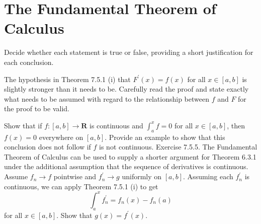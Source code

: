 \section{The Fundamental Theorem of Calculus}

\begin{exercise}
\end{exercise}
\begin{solution}
    \TODO
\end{solution}

\begin{exercise}
Decide whether each statement is true or false, providing a short justification for each conclusion.
\end{exercise}
\begin{solution}
    \TODO
\end{solution}

\begin{exercise} The hypothesis in Theorem 7.5.1 (i) that $F^{\prime}(x)=f(x)$ for all $x \in[a, b]$ is slightly stronger than it needs to be. Carefully read the proof and state exactly what needs to be assumed with regard to the relationship between $f$ and $F$ for the proof to be valid.
\end{exercise}
\begin{solution}
    \TODO
\end{solution}

\begin{exercise} Show that if $f:[a, b] \rightarrow \mathbf{R}$ is continuous and $\int_{a}^{x} f=0$ for all $x \in[a, b]$, then $f(x)=0$ everywhere on $[a, b]$. Provide an example to show that this conclusion does not follow if $f$ is not continuous. Exercise 7.5.5. The Fundamental Theorem of Calculus can be used to supply a shorter argument for Theorem 6.3.1 under the additional assumption that the sequence of derivatives is continuous.
Assume $f_{n} \rightarrow f$ pointwise and $f_{n}^{\prime} \rightarrow g$ uniformly on $[a, b]$. Assuming each $f_{n}^{\prime}$ is continuous, we can apply Theorem 7.5.1 (i) to get
$$
\int_{a}^{x} f_{n}^{\prime}=f_{n}(x)-f_{n}(a)
$$
for all $x \in[a, b]$. Show that $g(x)=f^{\prime}(x)$.
\end{exercise}
\begin{solution}
    \TODO
\end{solution}

